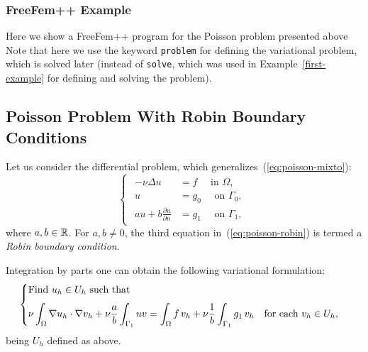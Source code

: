 \documentclass[12pt]{article}
\begin{document}
\subsubsection{FreeFem++ Example}

Here we show a FreeFem++ program for the Poisson problem presented above
Note that here we use the keyword \texttt{problem} for
defining the variational problem, which is solved later (instead of \texttt{solve}, which was used in Example~\ref{first-example} for defining and solving the problem).



\subsection{Poisson Problem With Robin Boundary Conditions}

Let us consider the differential problem, which generalizes~(\ref{eq:poisson-mixto}):
\begin{equation}
  \label{eq:poisson-robin}
  \begin{cases}
    \begin{aligned}
      -\nu\Delta u &= f \quad \text{ in } \Omega, \\
      u &= g_0 \quad \text{ on } \Gamma_0, \\
      au + b \frac{\partial u}{\partial n} &= g_1 \quad \text{ on } \Gamma_1,
    \end{aligned}
  \end{cases}
\end{equation}
where $a,b\in{\mathbb R}$. For $a,b\neq 0$, the third equation
in~(\ref{eq:poisson-robin}) is termed a \textit{Robin boundary
  condition}.

Integration by parts one can obtain the following variational formulation:
\begin{equation*}
  \begin{cases}
    \text{Find $u_h\in U_{h}$ such that}
    \\\noalign{\medskip}
    \begin{aligned}
      \nu\int_\Omega \nabla u_h \cdot \nabla v_h
      + \nu\frac a b \int_{\Gamma_1} u v
      = \int_\Omega f\, v_h
      + \nu \frac 1b \int_{\Gamma_1} g_1\, v_h
      \quad\text{for each } v_h\in U_{h},
    \end{aligned}
  \end{cases}
\end{equation*}
being $U_h$ defined as above.
\end{document}
